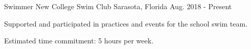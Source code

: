 \begin{cventries}
  \cventry
    {Swimmer} %
    {New College Swim Club} %
    {Sarasota, Florida} %
    {Aug. 2018 - Present} %
    {
      \begin{cvitems} %
        \item {Supported and participated in practices and events for the school swim team.}
        \item {Estimated time commitment: 5 hours per week.}
      \end{cvitems}
    }


\end{cventries}
